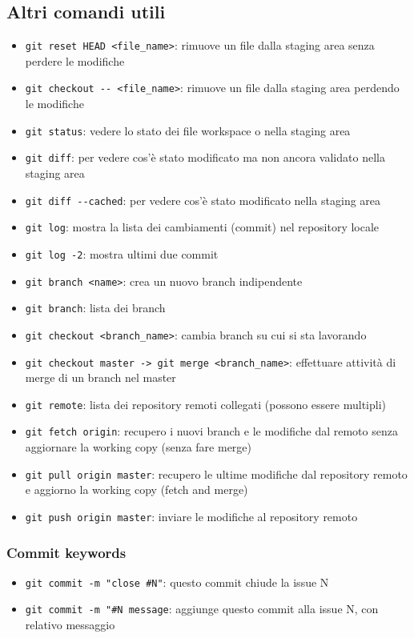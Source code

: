 \documentclass[10pt, a4paper]{article}
\begin{document}
\subsection{Altri comandi utili}
\begin{itemize}
    \item \verb|git reset HEAD <file_name>|: rimuove un file dalla staging area senza perdere le modifiche
    \item \verb|git checkout -- <file_name>|: rimuove un file dalla staging area perdendo le modifiche
    \item \verb|git status|: vedere lo stato dei file workspace o nella staging area
    \item \verb|git diff|: per vedere cos’è stato modificato ma non ancora validato nella staging area
    \item \verb|git diff --cached|: per vedere cos’è stato modificato nella staging area
    \item \verb|git log|: mostra la lista dei cambiamenti (commit) nel repository locale
    \item \verb|git log -2|: mostra ultimi due commit
    \item \verb|git branch <name>|: crea un nuovo branch indipendente
    \item \verb|git branch|: lista dei branch
    \item \verb|git checkout <branch_name>|: cambia branch su cui si sta lavorando
    \item \verb|git checkout master -> git merge <branch_name>|: effettuare attività di merge di un branch nel master
    \item \verb|git remote|: lista dei repository remoti collegati (possono essere multipli)
    \item \verb|git fetch origin|: recupero i nuovi branch e le modifiche dal remoto senza aggiornare la working copy (senza fare merge)
    \item \verb|git pull origin master|: recupero le ultime modifiche dal repository remoto e aggiorno la working copy (fetch and merge)
    \item \verb|git push origin master|: inviare le modifiche al repository remoto
\end{itemize}

\subsubsection*{Commit keywords}
\begin{itemize}
    \item \verb|git commit -m "close #N"|: questo commit chiude la issue N
    \item \verb|git commit -m "#N message|: aggiunge questo commit alla issue N, con relativo messaggio
\end{itemize}
\end{document}
